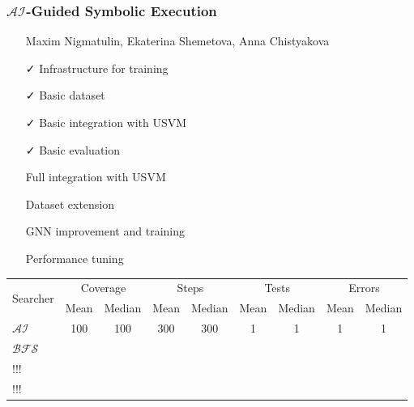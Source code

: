 \documentclass[xcolor=table,aspectratio=169]{beamer}
\begin{document}
\begin{frame}[fragile]
  \frametitle{$\mathcal{AI}$-Guided Symbolic Execution}
  \begin{itemize}
  \item[\faGroup] Maxim Nigmatulin, Ekaterina Shemetova, Anna Chistyakova
  \end{itemize}
  \vspace{0.5cm}
  \begin{minipage}{0.49\textwidth}
  \begin{itemize}
    \item[\faCheck] Infrastructure for training
    \item[\faCheck] Basic dataset
    \item[\faCheck] Basic integration with USVM
    \item[\faCheck] Basic evaluation
  \end{itemize}  
  \end{minipage}
  \begin{minipage}{0.49\textwidth}
  \begin{itemize}
    \item[\faGears] Full integration with USVM
    \item[\faGears] Dataset extension
    \item[\faGears] GNN improvement and training 
    \item[\faGears] Performance tuning
  \end{itemize}  
  \end{minipage}


  \begin{center}  
    \begin{tabular}{l |c c |c c |c c |c c }
      \hline 
      \multirow{2}{*}{Searcher} & \multicolumn{2}{c|}{Coverage} & \multicolumn{2}{c|}{Steps} & \multicolumn{2}{c|}{Tests} & \multicolumn{2}{c}{Errors} \\
                                & Mean & Median                & Mean & Median             &  Mean & Median            & Mean & Median                 \\
      \hline 
      $\mathcal{AI}$            &  100 &    100                &  300 & 300                &  1    &  1                &  1   &  1                     \\
      $\mathcal{BFS}$           &      &                       &      &                    &       &                   &      &                        \\
      $\mathcal{!!!}$           &      &                       &      &                    &       &                   &      &                        \\
      $\mathcal{!!!}$           &      &                       &      &                    &       &                   &      &                        \\
      \hline 
    \end{tabular}
  \end{center}
  
\end{frame}
\end{document}
